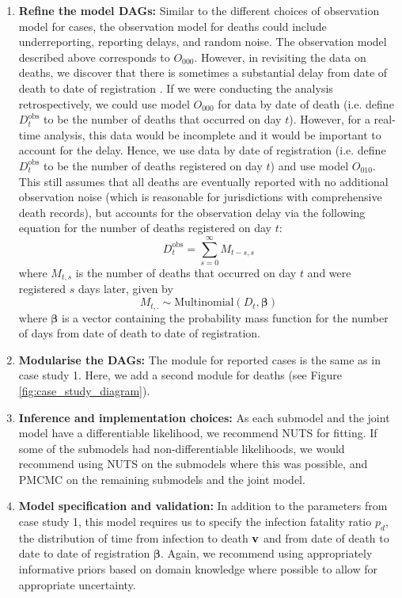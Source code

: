 \documentclass{article}
\begin{document}
\begin{enumerate}
\item \textbf{Refine the model DAGs:}       
    Similar to the different choices of observation model for cases, the observation model for deaths could include underreporting, reporting delays, and random noise. The observation model described above corresponds to $O_{000}$. However, in revisiting the data on deaths, we discover that there is sometimes a substantial delay from date of death to date of registration \citep{seaman2022nowcasting}. If we were conducting the analysis retrospectively, we could use model $O_{000}$ for data by date of death (i.e. define $D^\mathrm{obs}_t$ to be the number of deaths that occurred on day $t$). However, for a real-time analysis, this data would be incomplete and it would be important to account for the delay. Hence, we use data by date of registration (i.e. define $D^\mathrm{obs}_t$ to be the number of deaths registered on day $t$) and use model $O_{010}$. This still assumes that all deaths are eventually reported with no additional observation noise (which is reasonable for jurisdictions with comprehensive death records), but accounts for the observation delay via the following equation for the number of deaths registered on day $t$:
\begin{equation}
    D^\mathrm{obs}_t = \sum_{s=0}^\infty M_{t-s,s}
\end{equation}
where $M_{t,s}$ is the number of deaths that occurred on day $t$ and were registered $s$ days later, given by
\begin{equation}
    M_{t,.} \sim \mathrm{Multinomial}\left( D_t, \boldsymbol{\beta}\right) 
\end{equation}
where $\boldsymbol{\beta}$ is a vector containing the probability mass function for the number of days from date of death to date of registration.

 \item \textbf{Modularise the DAGs:} The module for reported cases is the same as in case study 1. Here, we add a second module for deaths (see Figure \ref{fig:case_study_diagram}).

\item \textbf{Inference and implementation choices:} As each submodel and the joint model have a differentiable likelihood, we recommend \ac{NUTS} for fitting. If some of the submodels had non-differentiable likelihoods, we would recommend using \ac{NUTS} on the submodels where this was possible, and \ac{PMCMC} on the remaining submodels and the joint model.

\item \textbf{Model specification and validation:} In addition to the parameters from case study 1, this model requires us to specify the infection fatality ratio $p_d$, the distribution of time from infection to death $\bf{v}$ and from date of death to date to date of registration $\boldsymbol{\beta}$. Again, we recommend using appropriately informative priors based on domain knowledge where possible to allow for appropriate uncertainty. 



\end{enumerate}
\end{document}
